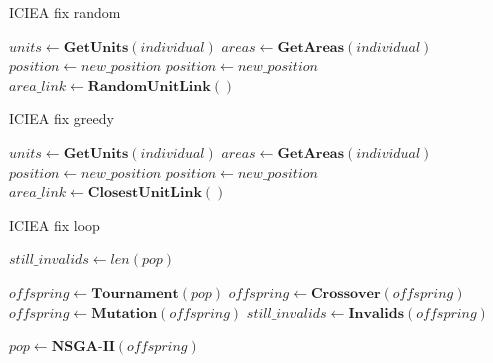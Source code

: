 \documentclass{llncs}
\begin{document}
\begin{algorithm}
\caption{ICIEA fix random}
\label{alg:fixrandom}
\begin{algorithmic}[1]


	\State $units \gets \textbf{GetUnits}(individual)$ 			
	\State $areas \gets \textbf{GetAreas}(individual)$
	\State
			\State $position \gets new\_position$
		\EndIf 
	\EndFor
			\State $position \gets new\_position$
		\EndIf 
	\EndFor
			\State $area\_link \gets \textbf{RandomUnitLink}()$
		\EndIf 
	\EndFor
\EndFor
\EndProcedure
\end{algorithmic}
\end{algorithm}

\FloatBarrier

\begin{algorithm}
\caption{ICIEA fix greedy}
\label{alg:fixgreedy}
\begin{algorithmic}[1]


	\State $units \gets \textbf{GetUnits}(individual)$ 			
	\State $areas \gets \textbf{GetAreas}(individual)$
	\State
			\State $position \gets new\_position$
		\EndIf 
	\EndFor
			\State $position \gets new\_position$
		\EndIf 
	\EndFor
			\State $area\_link \gets \textbf{ClosestUnitLink}()$
		\EndIf 
	\EndFor
\EndFor
\EndProcedure
\end{algorithmic}
\end{algorithm}

\FloatBarrier


\begin{algorithm}
\caption{ICIEA fix loop}
\label{alg:nofixloop}
\begin{algorithmic}[1]
\State $still\_invalids \gets len(pop)$

	\State $offspring\gets \textbf{Tournament}(pop)$
	\State $offspring\gets \textbf{Crossover}(offspring)$
	\State $offspring\gets \textbf{Mutation}(offspring)$
	\State $still\_invalids \gets \textbf{Invalids}(offspring)$

\EndWhile
\State $pop\gets \textbf{NSGA-II}(offspring)$
\end{algorithmic}
\end{algorithm}
\end{document}
